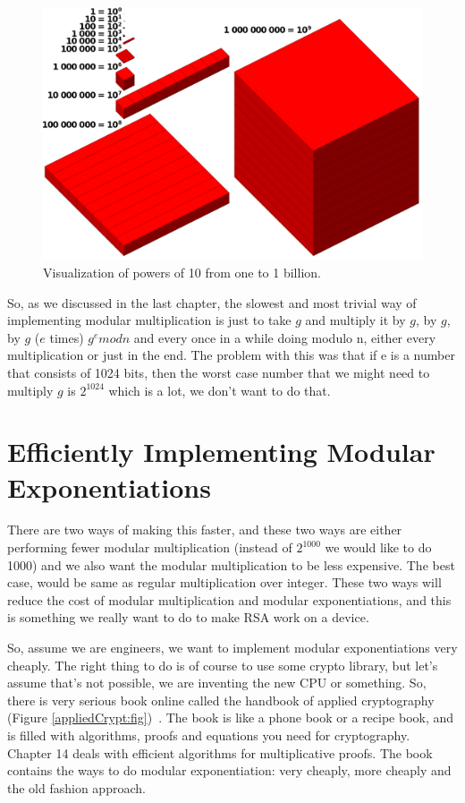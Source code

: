 \begin{figure}[H]
    \centering
    \includegraphics[scale=0.25]{images/vispow10.png}
    \caption{Visualization of powers of 10 from one to 1 billion.} \label{vispow10:fig}
\end{figure}

So, as we discussed in the last chapter, the slowest and most trivial way of implementing modular multiplication is just to take $g$ and multiply it by $g$, by $g$, by $g$ ($e$ times) \(g^e mod n\) and every once in a while doing modulo n, either every multiplication or just in the end. The problem with this was that if e is a number that consists of 1024 bits, then the worst case number that we might need to multiply $g$ is \( 2^{1024} \) which is a lot, we don’t want to do that.

\section{Efficiently Implementing Modular Exponentiations}\label{c1_basicformatting:sec}

There are two ways of making this faster, and these two ways are either performing fewer modular multiplication (instead of  \( 2^{1000} \)  we would like to do 1000) and we also want the modular multiplication to be less expensive. The best case, would be same as regular multiplication over integer. These two ways will reduce the cost of modular multiplication and modular exponentiations, and this is something we really want to do to make RSA work on a device.

So, assume we are engineers, we want to implement modular exponentiations very cheaply. The right thing to do is of course to use some crypto library, but let’s assume that’s not possible, we are inventing the new CPU or something. So, there is very serious book online called the handbook of applied cryptography (Figure \ref{appliedCrypt:fig})~\cite{katz1996handbook}. The book is like a phone book or a recipe book, and is filled with algorithms, proofs and equations you need for cryptography. Chapter 14 deals with efficient algorithms for multiplicative proofs. The book contains the ways to do modular exponentiation: very cheaply, more cheaply and the old fashion approach. 

